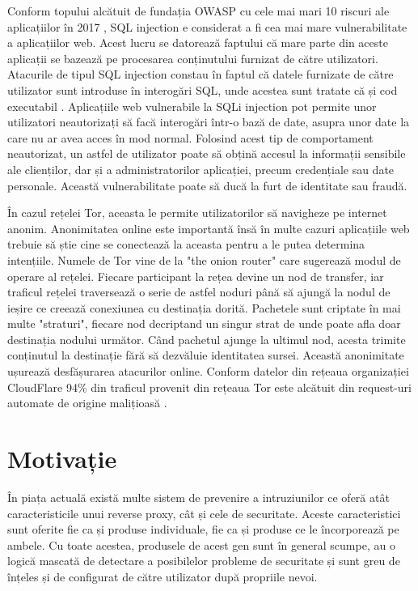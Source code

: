 Conform topului alcătuit de fundația OWASP cu cele mai mari 10 riscuri ale aplicațiilor în 2017 \cite{owasp}, SQL injection e considerat a fi cea mai mare vulnerabilitate a aplicațiilor web. Acest lucru se datorează faptului că mare parte din aceste aplicații se bazează pe procesarea conținutului furnizat de către utilizatori. Atacurile de tipul SQL injection constau în faptul că datele furnizate de către utilizator sunt introduse în interogări SQL, unde acestea sunt tratate că și cod executabil \cite{classification_and_countermeasures}. Aplicațiile web vulnerabile la SQLi injection pot permite unor utilizatori neautorizați să facă interogări într-o bază de date, asupra unor date la care nu ar avea acces în mod normal. Folosind acest tip de comportament neautorizat, un astfel de utilizator poate să obțină accesul la informații sensibile ale clienților, dar și a administratorilor aplicației, precum credențiale sau date personale. Această vulnerabilitate poate să ducă la furt de identitate sau fraudă.  
 
În cazul rețelei Tor, aceasta le permite utilizatorilor să navigheze pe internet anonim. Anonimitatea online este importantă însă în multe cazuri aplicațiile web trebuie să știe cine se conectează la aceasta pentru a le putea determina intențiile. Numele de Tor vine de la "the onion router" care sugerează modul de operare al rețelei. Fiecare participant la rețea devine un nod de transfer, iar traficul rețelei traversează o serie de astfel noduri până să ajungă la nodul de ieșire ce creează conexiunea cu destinația dorită. Pachetele sunt criptate în mai multe "straturi", fiecare nod decriptand un singur strat de unde poate afla doar destinația nodului următor. Când pachetul ajunge la ultimul nod, acesta trimite conținutul la destinație fără să dezvăluie identitatea sursei. Această anonimitate ușurează desfășurarea atacurilor online. Conform datelor din rețeaua organizației CloudFlare 94\% din traficul provenit din rețeaua Tor este alcătuit din request-uri automate de origine malițioasă \cite{tor_trouble}. 

 \section{Motivație}
În piața actuală există multe sistem de prevenire a intruziunilor ce oferă atât caracteristicile unui reverse proxy, cât și cele de securitate. Aceste caracteristici sunt oferite fie ca și produse individuale, fie ca și produse ce le încorporează pe ambele. Cu toate acestea, produsele de acest gen sunt în general scumpe, au o logică mascată de detectare a posibilelor probleme de securitate și sunt greu de înțeles și de configurat de către utilizator după propriile nevoi. 

